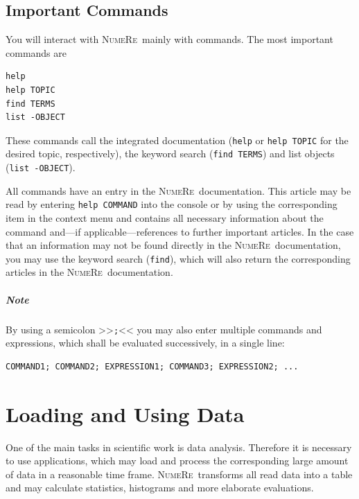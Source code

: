 \documentclass[DIV=14,headsepline,footsepline]{scrbook}
\newcommand{\NR}{\textsc{Nu\-me\-Re}}
\begin{document}
			\section{Important Commands}
				You will interact with \NR\ mainly with commands. The most important commands are
					\begin{lstlisting}
help
help TOPIC
find TERMS
list -OBJECT
					\end{lstlisting}
					These commands call the integrated documentation (\lstinline+help+ or \lstinline+help TOPIC+ for the desired topic, respectively), the keyword search (\lstinline+find TERMS+) and list objects (\lstinline+list -OBJECT+).
					
					All commands have an entry in the \NR\ documentation. This article may be read by entering \lstinline+help COMMAND+ into the console or by using the corresponding item in the context menu and contains all necessary information about the command and---if applicable---references to further important articles. In the case that an information may not be found directly in the \NR\ documentation, you may use the keyword search (\lstinline+find+), which will also return the corresponding articles in the \NR\ documentation.
					\paragraph{Note}
						By using a semicolon >>\lstinline+;+<< you may also enter multiple commands and expressions, which shall be evaluated successively, in a single line:
						\begin{lstlisting}
COMMAND1; COMMAND2; EXPRESSION1; COMMAND3; EXPRESSION2; ...
						\end{lstlisting}
		\chapter{Loading and Using Data}
			One of the main tasks in scientific work is data analysis. Therefore it is necessary to use applications, which may load and process the corresponding large amount of data in a reasonable time frame. \NR\ transforms all read data into a table and may calculate statistics, histograms and more elaborate evaluations.
\end{document}
